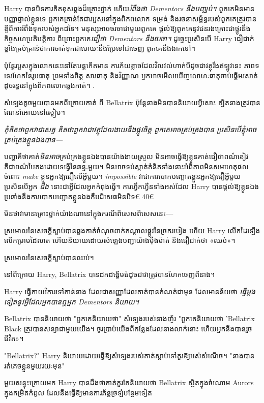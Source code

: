 {{Harry បានបិទការគិតខុសឆ្គងដ៏គ្រោះថ្នាក់ ហើយ\emph{រំពឹងថា Dementors នឹងបញ្ឈប់។} ពួកគេមិនមានបញ្ញាផ្ទាល់ខ្លួនទេ ពួកគេគ្រាន់តែជារបួសនៅក្នុងពិភពលោក ទម្រង់ និងរចនាសម្ព័ន្ធរបស់ពួកគេត្រូវបានខ្ចីពីការរំពឹងទុករបស់អ្នកដទៃ។ មនុស្សអាចចរចាជាមួយពួកគេ ផ្តល់ឱ្យពួកគេនូវជនរងគ្រោះជាថ្នូរនឹងកិច្ចសហប្រតិបត្តិការ ពីព្រោះពួកគេ\emph{ជឿថា Dementors នឹងចរចា។} ដូច្នេះប្រសិនបើ Harry ជឿជាក់ខ្លាំងគ្រប់គ្រាន់ថាការចាត់ទុកជាមោឃៈនឹងប្រែទៅជាចេញ ពួកគេនឹងងាកទៅ។

ប៉ុន្តែរបួសក្នុងលោកនេះនៅតែបន្តកើតមាន ការភ័យខ្លាចដែលវិលវល់ហាក់បីដូចជាវត្ថុរឹងឥឡូវនេះ ភាពទទេរហែកនៃរូបធាតុ ព្រមទាំងចិត្ត សារធាតុ និងវិញ្ញាណ អ្នកអាចមើលឃើញលោហៈធាតុចាប់ផ្តើមរសាត់ដូចរន្ធនៅក្នុងពិភពលោកឆ្លងកាត់។ .

សំឡេងតូចមួយបានមកពីក្រោយគាត់ ពី Bellatrix ប៉ុន្តែនាងមិនបាននិយាយអ្វីសោះ ត្បិតនាងត្រូវបានណែនាំអោយនៅស្ងៀម។

\emph{កុំគិតថាពួកវាជាសត្វ គិតថាពួកវាជាវត្ថុដែលងាយនឹងផ្លូវចិត្ត ពួកគេអាចគ្រប់គ្រងបាន ប្រសិនបើខ្ញុំអាចគ្រប់គ្រងខ្លួនឯងបាន—}

បញ្ហាគឺថាគាត់\emph{មិនអាច}គ្រប់គ្រងខ្លួនឯងបានយ៉ាងងាយស្រួល មិនអាចធ្វើឱ្យខ្លួនគាត់ជឿថាពណ៌ខៀវគឺជាពណ៌បៃតងដោយទង្វើនៃឆន្ទៈមួយ។ មិន​អាច​ទប់​ស្កាត់​គំនិត​ទាំង​នោះ​អំពី​ភាព​មិន​សម​ហេតុ​ផល​ចំពោះ \emph{make} ខ្លួន​អ្នក​ឱ្យ​ជឿ​លើ​អ្វី​មួយ។ \emph{impossible} វាជាការបោកបញ្ឆោតខ្លួនអ្នកឱ្យជឿអ្វីមួយ ប្រសិនបើអ្នក \emph{ដឹង} នោះជាអ្វីដែលអ្នកកំពុងធ្វើ។ ការហ្វឹកហ្វឺនទាំងអស់ដែល Harry បានផ្តល់ឱ្យខ្លួនឯងប្រឆាំងនឹងការបោកបញ្ឆោតខ្លួនឯងគឺបដិសេធមិនបិទ€ 40€{{មិនថាវាមានគ្រោះថ្នាក់យ៉ាងណានៅក្នុងករណីពិសេសពិសេសនេះ—}

ស្រមោល​នៃ​សេចក្ដី​ស្លាប់​បាន​ឆ្លង​កាត់​ចំណុច​ពាក់​កណ្ដាល​ផ្លូវ​នៃ​ច្រក​របៀង ហើយ Harry លើក​ដៃ​ឡើង លើក​ម្រាម​ដៃ​លាត ហើយ​និយាយ​ដោយ​សំឡេង​បញ្ជា​យ៉ាង​ម៉ឺងម៉ាត់ និង​ជឿជាក់​ថា «ឈប់»។

ស្រមោលនៃសេចក្តីស្លាប់បានឈប់។

នៅពីក្រោយ Harry, Bellatrix បានដកដង្ហើមធំដូចជាវាត្រូវបានហែកចេញពីនាង។

Harry ធ្វើកាយវិការទៅកាន់នាង ដែលជាសញ្ញាដែលគាត់បានកំណត់ជាមុន ដែលមានន័យថា \emph{ធ្វើម្តងទៀតនូវអ្វីដែលអ្នកបានឮអ្នក Dementors និយាយ។}

Bellatrix បាននិយាយថា "ពួកគេនិយាយថា" សំឡេងរបស់នាងញ័រ "ពួកគេនិយាយថា 'Bellatrix Black ត្រូវបានសន្យាជាមួយយើង។ ចូរ​ប្រាប់​យើង​ពី​កន្លែង​ដែល​នាង​លាក់​នោះ ហើយ​អ្នក​នឹង​បាន​រួច​ជីវិត»។

"Bellatrix?" Harry និយាយដោយធ្វើឱ្យសំឡេងរបស់គាត់ស្តាប់ទៅគួរឱ្យអស់សំណើច។ "នាងបានរត់គេចខ្លួនមួយរយៈមុន"

មួយសន្ទុះក្រោយមក Harry បានដឹងថាគាត់គួរតែនិយាយថា Bellatrix ស្ថិតក្នុងចំណោម Aurors ក្នុងកម្រិតកំពូល ដែលនឹងធ្វើឱ្យមានការភ័ន្តច្រឡំបន្ថែមទៀត

}}}
